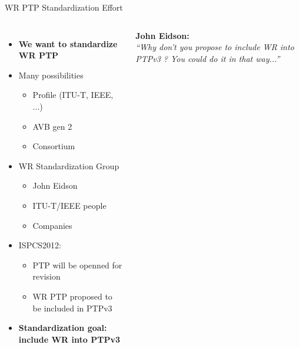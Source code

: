 \documentclass[compress,red]{beamer}
\begin{document}
\begin{frame}{WR PTP Standardization Effort}

\begin{columns}[c]
  \begin{itemize}
    \item \textbf{We want to standardize WR PTP}
    \item Many possibilities 
    \begin{itemize}
      \item Profile (ITU-T, IEEE, ...)
      \item AVB gen 2
      \item Consortium
    \end{itemize}
    \item WR Standardization Group
    \begin{itemize}
      \item John Eidson
      \item ITU-T/IEEE people
      \item Companies 
    \end{itemize}
    \item ISPCS2012: 
    \begin{itemize}
      \item PTP will be openned for revision
      \item WR PTP proposed to be included in PTPv3
    \end{itemize}
    \item \textbf{Standardization goal: include WR into PTPv3}
  \end{itemize}

    \begin{center}
      \textbf{John Eidson:} \\
      \textit{“Why don't you propose to include WR into PTPv3 ? You could do it in that way...”}
     \end{center}

\end{columns}




\end{frame}
\end{document}
